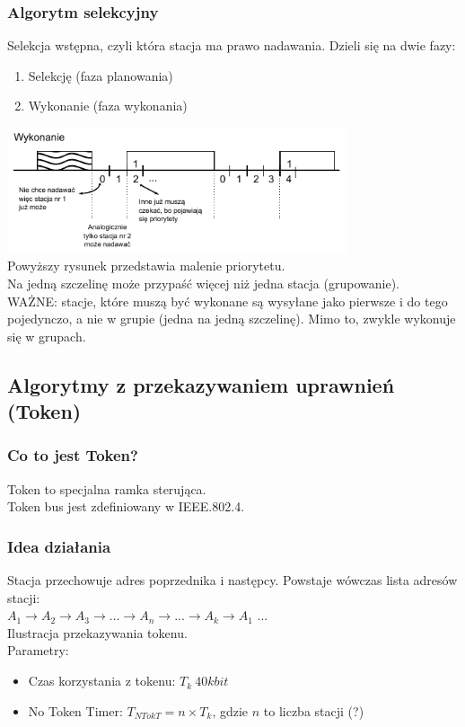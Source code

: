 \documentclass[a4paper,twoside]{article}
\begin{document}
		\subsubsection{Algorytm selekcyjny}
			Selekcja wstępna, czyli która stacja ma prawo nadawania. Dzieli się na dwie fazy:
			\begin{enumerate}
				\item Selekcję (faza planowania)
				\item Wykonanie (faza wykonania)
			\end{enumerate}
			\includegraphics[width=10cm]{./images/image26.pdf}\\
			Powyższy rysunek przedstawia malenie priorytetu.\\
			Na jedną szczelinę może przypaść więcej niż jedna stacja (grupowanie).\\
			WAŻNE: stacje, które muszą być wykonane są wysyłane jako pierwsze i do tego pojedynczo, a nie w grupie (jedna na jedną szczelinę). Mimo to, zwykle wykonuje się w grupach.
	\subsection{Algorytmy z przekazywaniem uprawnień (Token)}
		\subsubsection{Co to jest Token?}
			Token to specjalna ramka sterująca.\\
			Token bus jest zdefiniowany w IEEE.802.4.
		\subsubsection{Idea działania}
			Stacja przechowuje adres poprzednika i następcy. Powstaje wówczas lista adresów stacji:\\
			$ A_1 \rightarrow A_2 \rightarrow A_3 \rightarrow ... \rightarrow A_n \rightarrow ... \rightarrow A_k \rightarrow A_1 $ ...\\
			Ilustracja przekazywania tokenu.\\
			Parametry:
			\begin{itemize}
				\item Czas korzystania z tokenu: $ T_k~40kbit $
				\item No Token Timer: $ T_{NTokT}=n\times T_k $, gdzie $ n $ to liczba stacji (?)
			\end{itemize}
\end{document}
